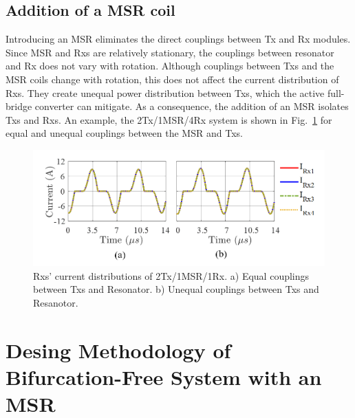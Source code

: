 \documentclass[journal]{IEEEtran}
\begin{document}
\subsection{Addition of a MSR coil}
Introducing an MSR eliminates the direct couplings between Tx and Rx modules. 
Since MSR and Rxs are relatively stationary, the couplings between resonator and Rx does not vary with rotation.
Although couplings between Txs and the MSR coils change with rotation, this does not affect the current distribution of Rxs.
They create unequal power distribution between Txs, which the active full-bridge converter can mitigate.
As a consequence, the addition of an MSR isolates Txs and Rxs. 
An example, the 2Tx/1MSR/4Rx system is shown in Fig.~\ref{fig:unbalance-Res} for equal and unequal couplings between the MSR and Txs.
\begin{figure}[h]
    \centering
    \includegraphics[width=1\linewidth]{balance_Res2.png}
    \caption{Rxs' current distributions of 2Tx/1MSR/1Rx. a) Equal couplings between Txs and Resonator. b) Unequal couplings between Txs and Resanotor.}
    \label{fig:unbalance-Res}
\end{figure}
\section{Desing Methodology of Bifurcation-Free System with an MSR}
\end{document}
